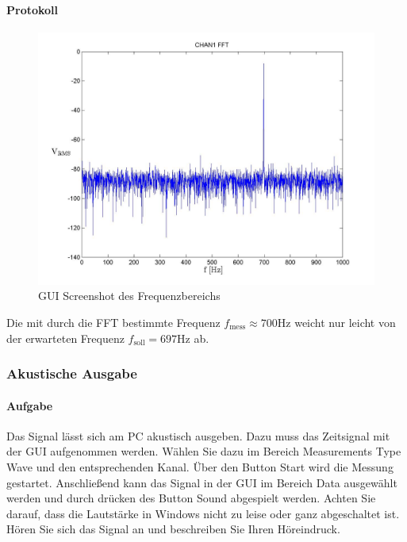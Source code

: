 \documentclass[10pt]{report}
\begin{document}
        \paragraph{Protokoll}
        \begin{center}
            \begin{figure}[H]
                \includegraphics[width=\textwidth]{Screenshot_GUI_4121_chan1_fft.jpg}
              \caption{GUI Screenshot des Frequenzbereichs}
            \end{figure}
        \end{center}

        Die mit durch die FFT bestimmte Frequenz $f_\text{mess} \approx 700\si{\hertz}$
        weicht nur leicht von der erwarteten Frequenz $f_\text{soll} = 697 \si{\hertz}$
        ab.


        \subsubsection{Akustische Ausgabe}
        \paragraph{Aufgabe}
        Das Signal lässt sich am PC akustisch ausgeben. Dazu muss das Zeitsignal mit
        der GUI aufgenommen werden. Wählen Sie dazu im Bereich Measurements Type
        \glqq{}Wave\grqq{} und den entsprechenden Kanal. Über den Button \glqq{}Start\grqq{} wird die Messung
        gestartet. Anschließend kann das Signal in der GUI im Bereich \glqq{}Data\grqq{} ausgewählt
        werden und durch drücken des Button \glqq{}Sound\grqq{} abgespielt werden. Achten Sie darauf,
        dass die Lautstärke in Windows nicht zu leise oder ganz abgeschaltet ist. Hören
        Sie sich das Signal an und beschreiben Sie Ihren Höreindruck.
\end{document}
